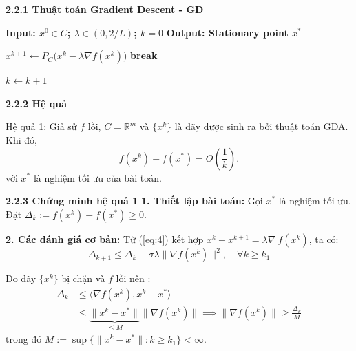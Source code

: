 \begin{frame}[shrink]{\textbf{\large 2.2.1 Thuật toán Gradient Descent - GD}}
\vspace*{-1cm}
\footnotesize
\begin{algorithm}[H]
\caption{(Gradient Descent Algorithm-GD)}
\begin{algorithmic}[1]

\State \textbf{Input: $x^0 \in C$; $\lambda \in (0, 2/L)$; $k=0$ }
\State \textbf{Output: Stationary point $x^*$}

    \State $x^{k+1} \gets P_C\big(x^k - \lambda \nabla f(x^k)\big)$
        \State \textbf{break}
    \EndIf

    \State $k \gets k + 1$
\EndWhile

\end{algorithmic}
\end{algorithm}
\end{frame}

\begin{frame}{\textbf{\large 2.2.2 Hệ quả}}
    \vspace*{-1cm}
    \begin{exampleblock}{Hệ quả 1: }
        Giả sử $f$ lồi, $C = \mathbb{R}^m$ và $\{x^k\}$ là dãy được sinh ra bởi thuật toán GDA. Khi đó,
        $$f(x^k) - f(x^*) = O\left(\frac{1}{k}\right).$$
        với $x^*$ là nghiệm tối ưu của bài toán.
    \end{exampleblock}
\end{frame}


\begin{frame}{\textbf{\large 2.2.3 Chứng minh hệ quả 1}}    \vspace*{-1.5cm}    \textbf{1. Thiết lập bài toán:}
    Gọi $x^*$ là nghiệm tối ưu. Đặt $\Delta_k := f(x^k) - f(x^*) \ge 0$.

    \textbf{2. Các đánh giá cơ bản:}
    Từ (\ref{eq:4}) kết hợp $x^k-x^{k+1} = \lambda \nabla \ f(x^k)$, ta có:
    \begin{equation} \label{eq:rate_1}
        \Delta_{k+1} \le \Delta_k - \sigma \lambda \|\nabla f(x^k)\|^2, \quad \forall k \ge k_1
    \end{equation}

    Do dãy $\{ x^k\}$ bị chặn và $f$ lồi nên :
    \begin{equation} \label{eq:rate_2}
    \begin{split}
        \Delta_k &\le \langle \nabla f(x^k), x^k - x^* \rangle \\
                 &\le \underbrace{\|x^k - x^*\|}_{\le M} \|\nabla f(x^k)\| \implies \|\nabla f(x^k)\| \ge \frac{\Delta_k}{M}
    \end{split}
\end{equation}
trong đó $M := \sup \{ \|x^k - x^*\| : k \ge k_1 \} < \infty$.
\end{frame}

